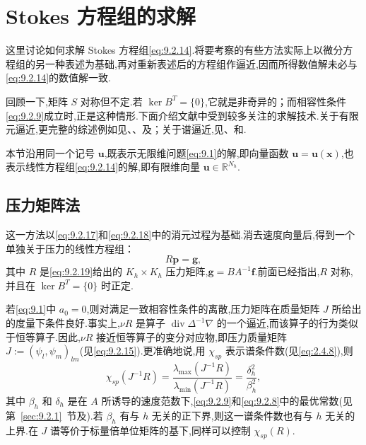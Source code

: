 \section{Stokes 方程组的求解}\label{sec:9.6}

这里讨论如何求解 Stokes 方程组\eqref{eq:9.2.14}.将要考察的有些方法实际上以微分方程组的另一种表述为基础,再对重新表述后的方程组作逼近,因而所得数值解未必与\eqref{eq:9.2.14}的数值解一致.

回顾一下,矩阵 \(S\) 对称但不定.若 \(\ker B^T=\{0\}\),它就是非奇异的；而相容性条件\eqref{eq:9.2.9}成立时,正是这种情形.下面介绍文献中受到较多关注的求解技术.关于有限元逼近,更完整的综述例如见、、及；关于谱逼近,见、和.

本节沿用同一个记号 \(\boldsymbol{u}\),既表示无限维问题\eqref{eq:9.1}的解,即向量函数 \(\boldsymbol{u}=\boldsymbol{u}(\boldsymbol{x})\),也表示线性方程组\eqref{eq:9.2.14}的解,即有限维向量 \(\boldsymbol{u}\in\mathbb R^{N_h}\).

\subsection{压力矩阵法}\label{sec:9.6.1}

这一方法以\eqref{eq:9.2.17}和\eqref{eq:9.2.18}中的消元过程为基础.消去速度向量后,得到一个单独关于压力的线性方程组：
\begin{equation}\label{eq:9.6.1}
  R\boldsymbol{p}=\boldsymbol{g},
\end{equation}
其中 \(R\) 是\eqref{eq:9.2.19}给出的 \(K_h\times K_h\) 压力矩阵,\(\boldsymbol{g}=BA^{-1}\boldsymbol{f}\).前面已经指出,\(R\) 对称,并且在 \(\ker B^T=\{0\}\) 时正定.

若\eqref{eq:9.1}中 \(a_0=0\),则对满足一致相容性条件的离散,压力矩阵在质量矩阵 \(J\) 所给出的度量下条件良好.事实上,\(\nu R\) 是算子 \(\operatorname{div}\Delta^{-1}\nabla\) 的一个逼近,而该算子的行为类似于恒等算子.因此,\(\nu R\) 接近恒等算子的变分对应物,即压力质量矩阵 \(J:=(\psi_l,\psi_m)_{lm}\)(见\eqref{eq:9.2.15}).更准确地说,用 \(\chi_{sp}\) 表示谱条件数(见\eqref{eq:2.4.8}),则
\begin{equation}\label{eq:9.6.2}
  \chi_{sp}(J^{-1}R)
     =\frac{\lambda_{\max}(J^{-1}R)}{\lambda_{\min}(J^{-1}R)}
     =\frac{\delta_h^2}{\beta_h^2},
\end{equation}
其中 \(\beta_h\) 和 \(\delta_h\) 是在 \(A\) 所诱导的速度范数下,\eqref{eq:9.2.9}和\eqref{eq:9.2.8}中的最优常数(见第~\ref{sec:9.2.1}~节及).若 \(\beta_h\) 有与 \(h\) 无关的正下界,则这一谱条件数也有与 \(h\) 无关的上界.在 \(J\) 谱等价于标量倍单位矩阵的基下,同样可以控制 \(\chi_{sp}(R)\).

